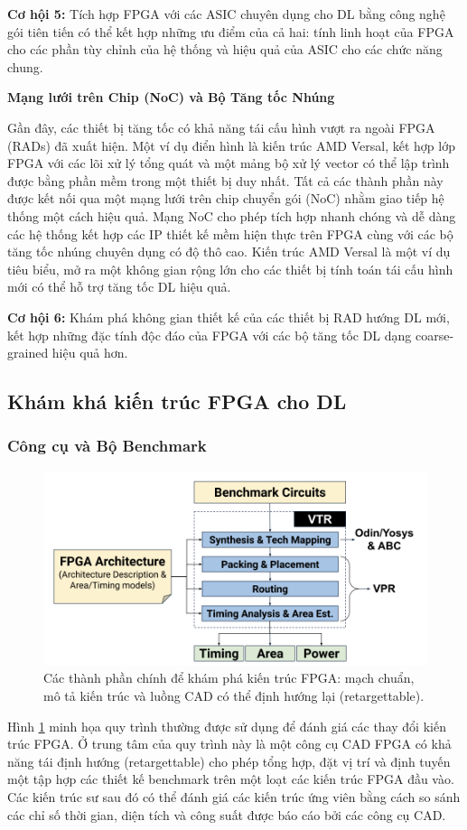 \documentclass[a4paper]{article}
\begin{document}
\textbf{Cơ hội 5:} Tích hợp FPGA với các ASIC chuyên dụng cho DL bằng công nghệ gói tiên tiến có thể kết hợp những ưu điểm của cả hai: tính linh hoạt của FPGA cho các phần tùy chỉnh của hệ thống và hiệu quả của ASIC cho các chức năng chung.

\textbf{Mạng lưới trên Chip (NoC) và Bộ Tăng tốc Nhúng}

Gần đây, các thiết bị tăng tốc có khả năng tái cấu hình vượt ra ngoài FPGA (RADs) đã xuất hiện. Một ví dụ điển hình là kiến trúc AMD Versal, kết hợp lớp FPGA với các lõi xử lý tổng quát và một mảng bộ xử lý vector có thể lập trình được bằng phần mềm trong một thiết bị duy nhất. Tất cả các thành phần này được kết nối qua một mạng lưới trên chip chuyển gói (NoC) nhằm giao tiếp hệ thống một cách hiệu quả. Mạng NoC cho phép tích hợp nhanh chóng và dễ dàng các hệ thống kết hợp các IP thiết kế mềm hiện thực trên FPGA cùng với các bộ tăng tốc nhúng chuyên dụng có độ thô cao. Kiến trúc AMD Versal là một ví dụ tiêu biểu, mở ra một không gian rộng lớn cho các thiết bị tính toán tái cấu hình mới có thể hỗ trợ tăng tốc DL hiệu quả.

\textbf{Cơ hội 6:} Khám phá không gian thiết kế của các thiết bị RAD hướng DL mới, kết hợp những đặc tính độc đáo của FPGA với các bộ tăng tốc DL dạng coarse-grained hiệu quả hơn.

\subsection{Khám khá kiến trúc FPGA cho DL}
\subsubsection{Công cụ và Bộ Benchmark}

\begin{figure} [!h]
    \centering
    \includegraphics[width=0.75\linewidth]{assets/fpga_9.png}
    \caption{Các thành phần chính để khám phá kiến trúc FPGA: mạch chuẩn, mô tả kiến trúc và luồng CAD có thể định hướng lại (retargettable).}
    \label{fig:fpga_9}
\end{figure}
Hình \ref{fig:fpga_9} minh họa quy trình thường được sử dụng để đánh giá các thay đổi kiến trúc FPGA. Ở trung tâm của quy trình này là một công cụ CAD FPGA có khả năng tái định hướng (retargettable) cho phép tổng hợp, đặt vị trí và định tuyến một tập hợp các thiết kế benchmark trên một loạt các kiến trúc FPGA đầu vào. Các kiến trúc sư sau đó có thể đánh giá các kiến trúc ứng viên bằng cách so sánh các chỉ số thời gian, diện tích và công suất được báo cáo bởi các công cụ CAD.
\end{document}
